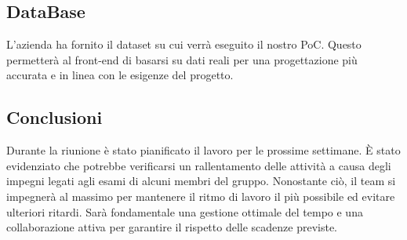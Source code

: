 \documentclass{article}
\newcommand{\isEsterno}{0}
\begin{document}
\subsection{DataBase}
L'azienda ha fornito il dataset su cui verrà eseguito il nostro PoC. Questo permetterà al front-end di basarsi su dati reali per una progettazione più accurata e in linea con le esigenze del progetto.

\subsection{Conclusioni}
Durante la riunione è stato pianificato il lavoro per le prossime settimane. È stato evidenziato che potrebbe verificarsi un rallentamento delle attività a causa degli impegni legati agli esami di alcuni membri del gruppo. Nonostante ciò, il team si impegnerà al massimo per mantenere il ritmo di lavoro il più possibile ed evitare ulteriori ritardi. Sarà fondamentale una gestione ottimale del tempo e una collaborazione attiva per garantire il rispetto delle scadenze previste.



\ifthenelse{\equal{\isEsterno}{1}}{
    \begin{table}[b]
        \begin{tabular}{@{}p{.5in}p{4in}@{}}
            Data:  & \hrulefill \\
                   &     		\\
                   &     		\\
            Firma: & \hrulefill \\
        \end{tabular}
        \end{table}
}{}
\end{document}
